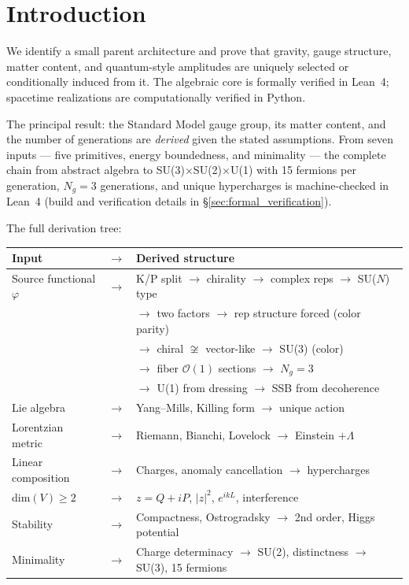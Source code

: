 \documentclass[12pt,a4paper]{article}
\begin{document}
\section{Introduction}

We identify a small parent architecture and prove that gravity, gauge structure, matter content, and quantum-style amplitudes are uniquely selected or conditionally induced from it. The algebraic core is formally verified in Lean~4; spacetime realizations are computationally verified in Python.

The principal result: the Standard Model gauge group, its matter content, and the number of generations are \emph{derived} given the stated assumptions. From seven inputs --- five primitives, energy boundedness, and minimality --- the complete chain from abstract algebra to SU(3)$\times$SU(2)$\times$U(1) with 15 fermions per generation, $N_g = 3$ generations, and unique hypercharges is machine-checked in Lean~4 (build and verification details in \S\ref{sec:formal_verification}).

The full derivation tree:

\begin{center}
\begin{tabular}{lcl}
\toprule
Input & $\longrightarrow$ & Derived structure \\
\midrule
Source functional $\varphi$ & $\longrightarrow$ & K/P split $\to$ chirality $\to$ complex reps $\to$ SU($N$) type \\
& & $\to$ two factors $\to$ rep structure forced (color parity) \\
& & $\to$ chiral $\not\cong$ vector-like $\to$ SU(3) (color) \\
& & $\to$ fiber $\mathcal{O}(1)$ sections $\to$ $N_g = 3$ \\
& & $\to$ U(1) from dressing $\to$ SSB from decoherence \\
Lie algebra & $\longrightarrow$ & Yang--Mills, Killing form $\to$ unique action \\
Lorentzian metric & $\longrightarrow$ & Riemann, Bianchi, Lovelock $\to$ Einstein $+ \Lambda$ \\
Linear composition & $\longrightarrow$ & Charges, anomaly cancellation $\to$ hypercharges \\
dim$(V) \geq 2$ & $\longrightarrow$ & $z = Q + iP$, $|z|^2$, $e^{ikL}$, interference \\
Stability & $\longrightarrow$ & Compactness, Ostrogradsky $\to$ 2nd order, Higgs potential \\
Minimality & $\longrightarrow$ & Charge determinacy $\to$ SU(2), distinctness $\to$ SU(3), 15 fermions \\
\bottomrule
\end{tabular}
\end{center}
\end{document}
